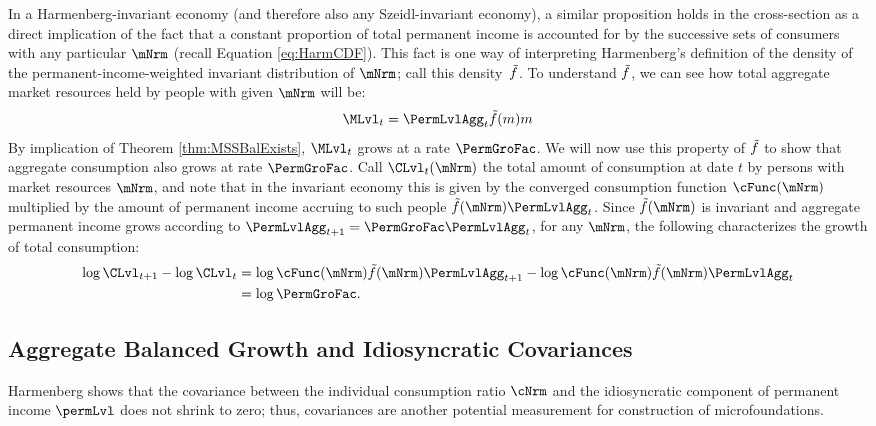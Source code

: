 \documentclass[BufferStockTheory]{subfiles}
\begin{document}
In a Harmenberg-invariant economy (and therefore also any Szeidl-invariant economy), a similar proposition holds in the cross-section as a direct implication of the fact that a constant proportion of total permanent income is accounted for by the successive sets of consumers with any particular $\mNrm$ (recall Equation \eqref{eq:HarmCDF}).
This fact is one way of interpreting Harmenberg's definition of the density of the permanent-income-weighted invariant distribution of $\mNrm$; call this density~$\tilde{f}$.
To understand $\tilde{f}$, we can see how total aggregate market resources held by people with given $\mNrm$ will be:
%
%
\begin{equation}
\MLvl_{t}=\PermLvlAgg_{t}\Harm{f}(m)m
\end{equation}
%
%
By implication of Theorem \ref{thm:MSSBalExists}, $\MLvl_{t}$ grows at a rate $\PermGroFac$.
We will now use this property of $\tilde{f}$ to show that aggregate consumption also grows at rate $\PermGroFac$.
Call $\CLvl_{t}(\mNrm)$ the total amount of consumption at date $t$ by persons with market resources $\mNrm$, and note that in the invariant economy this is given by the converged consumption function $\cFunc(\mNrm)$ multiplied by the amount of permanent income accruing to such people $\Harm{f}(\mNrm)\PermLvlAgg_{t}$.
Since $\Harm{f}(\mNrm)$ is invariant and aggregate permanent income grows according to $\PermLvlAgg_{t+1} = \PermGroFac \PermLvlAgg_{t}$, for any $\mNrm$, the following characterizes the growth of total consumption:
%
%
\begin{equation*}
  \begin{aligned}
    \log \CLvl_{t+1} - \log \CLvl_{t} &  \notag
    = \log \cFunc(\mNrm) \Harm{f}(\mNrm)\PermLvlAgg_{t+1} - \log \cFunc(\mNrm)\Harm{f}(\mNrm)\PermLvlAgg_{t} \\
    & = \log \PermGroFac.
  \end{aligned}
\end{equation*}



\hypertarget{Balanced-Growth-Of-Covariances}{}
\subsection{Aggregate Balanced Growth and Idiosyncratic Covariances}\label{subsec:Covariances}

Harmenberg shows that the covariance between the individual consumption ratio $\cNrm$ and the idiosyncratic component of permanent income $\permLvl$ does not shrink to zero; thus, covariances are another potential measurement for construction of microfoundations.
\end{document}
